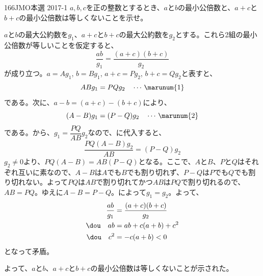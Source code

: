 \begin{prob}{166}{}{JMO本選 2017-1}
 $a, b, c$を正の整数とするとき、$a$と$b$の最小公倍数と、$a+c$と$b+c$の最小公倍数は等しくないことを示せ。
\end{prob}
$a$と$b$の最大公約数を$g_1$、$a+c$と$b+c$の最大公約数を$g_2$とする。これら2組の最小公倍数が等しいことを仮定すると、
\[ \frac{ab}{g_1}=\frac{(a+c)(b+c)}{g_2} \]
が成り立つ。$a=Ag_1$, $b=Bg_1$, $a+c=Pg_2$, $b+c=Qg_2$と表すと、
\[ ABg_1=PQg_2 \quad \cdots\,\marunum{1}\]
である。次に、$a-b=(a+c)-(b+c)$により、
\[ (A-B)g_1=(P-Q)g_2 \quad \cdots\, \marunum{2} \]
である。から、$g_1=\dfrac{PQ}{AB}g_2$なので、に代入すると、
\[ \frac{PQ(A-B)g_2}{AB}=(P-Q)g_2 \]
$g_2\neq 0$より、$PQ(A-B)=AB(P-Q)$となる。ここで、$A$と$B$、$P$と$Q$はそれぞれ互いに素なので、$A-B$は$A$でも$B$でも割り切れず、$P-Q$は$P$でも$Q$でも割り切れない。よって$PQ$は$AB$で割り切れてかつ$AB$は$PQ$で割り切れるので、$AB=PQ$。ゆえに$A-B=P-Q$。によって$g_1=g_2$。よって、
\begin{align*}
 \frac{ab}{g_1}&=\frac{(a+c)(b+c)}{g_2} \\
 \dou\quad ab&=ab+c(a+b)+c^2 \\
 \dou\quad c^2&=-c(a+b) < 0
\end{align*}
となって矛盾。

よって、$a$と$b$、$a+c$と$b+c$の最小公倍数は等しくないことが示された。
